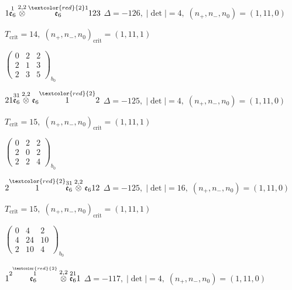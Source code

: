 \documentclass[10pt]{article}
\begin{document}
\smallskip

$1\overset{1}{\mathfrak{e}_6}\overset{2,2}{\otimes}\overset{\textcolor{red}{2}1}{\mathfrak{e}_6}123$ \quad $\Delta=-126,\; |\det|=4,\; (n_+,n_-,n_0)=(1,11,0)$

\hspace{1em}$T_{\text{crit}}=14,\; (n_+,n_-,n_0)_{\text{crit}}=(1,11,1)$

\hspace{2em}$\left(\begin{smallmatrix}0 & 2 & 2 \\ 2 & 1 & 3 \\ 2 & 3 & 5\end{smallmatrix}\right)_{\!b_0}$

\smallskip

$21\overset{31}{\mathfrak{e}_6}\overset{2,2}{\otimes}\mathfrak{e}_6\overset{\textcolor{red}{2}}{1}2$ \quad $\Delta=-125,\; |\det|=4,\; (n_+,n_-,n_0)=(1,11,0)$

\hspace{1em}$T_{\text{crit}}=15,\; (n_+,n_-,n_0)_{\text{crit}}=(1,11,1)$

\hspace{2em}$\left(\begin{smallmatrix}0 & 2 & 2 \\ 2 & 0 & 2 \\ 2 & 2 & 4\end{smallmatrix}\right)_{\!b_0}$

$2\overset{\textcolor{red}{2}}{1}\overset{31}{\mathfrak{e}_6}\overset{2,2}{\otimes}\mathfrak{e}_612$ \quad $\Delta=-125,\; |\det|=16,\; (n_+,n_-,n_0)=(1,11,0)$

\hspace{1em}$T_{\text{crit}}=15,\; (n_+,n_-,n_0)_{\text{crit}}=(1,11,1)$

\hspace{2em}$\left(\begin{smallmatrix}0 & 4 & 2 \\ 4 & 24 & 10 \\ 2 & 10 & 4\end{smallmatrix}\right)_{\!b_0}$

\smallskip

$1\overset{2\overset{\textcolor{red}{2}}{1}}{\mathfrak{e}_6}\overset{2,2}{\otimes}\overset{21}{\mathfrak{e}_6}1$ \quad $\Delta=-117,\; |\det|=4,\; (n_+,n_-,n_0)=(1,11,0)$
\end{document}

